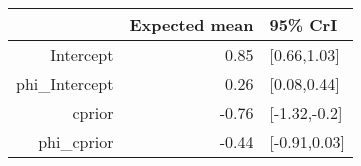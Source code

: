 \begin{tabular}{rrl}
  \hline
 & Expected mean & 95\% CrI \\ 
  \hline
Intercept & 0.85 & [0.66,1.03] \\ 
  phi\_Intercept & 0.26 & [0.08,0.44] \\ 
  cprior & -0.76 & [-1.32,-0.2] \\ 
  phi\_cprior & -0.44 & [-0.91,0.03] \\ 
   \hline
\end{tabular}

